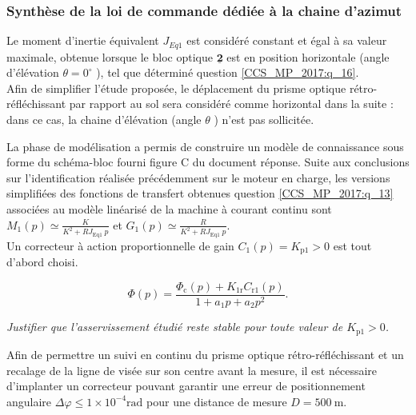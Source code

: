 %
\subsubsection{ Synthèse de la loi de commande dédiée à la chaine d'azimut}
Le moment d'inertie équivalent $J_{E q 1}$ est considéré constant et égal à sa valeur maximale, obtenue lorsque le bloc optique $\underline{\mathbf{2}}$ est en position horizontale (angle d'élévation $\theta=0^{\circ}$ ), tel que déterminé question \ref{CCS_MP_2017:q_16}.\\
Afin de simplifier l'étude proposée, le déplacement du prisme optique rétro-réfléchissant par rapport au sol sera considéré comme horizontal dans la suite : dans ce cas, la chaine d'élévation (angle $\theta$ ) n'est pas sollicitée.

La phase de modélisation a permis de construire un modèle de connaissance sous forme du schéma-bloc fourni figure C du document réponse. Suite aux conclusions sur l'identification réalisée précédemment sur le moteur en charge, les versions simplifiées des fonctions de transfert obtenues question \ref{CCS_MP_2017:q_13} associées au modèle linéarisé de la machine à courant continu sont $M_{1}(p) \simeq \frac{K}{K^{2}+R J_{\text {Eq1 }} p}$ et $G_{1}(p) \simeq \frac{R}{K^{2}+R J_{\text {Eq1 }} p}$.\\
Un correcteur à action proportionnelle de gain $C_{1}(p)=K_{\mathrm{p} 1}>0$ est tout d'abord choisi.\\

$$
\Phi(p)=\frac{\Phi_{\mathrm{c}}(p)+K_{1 \mathrm{r}} C_{\mathrm{r} 1}(p)}{1+a_{1} p+a_{2} p^{2}}.
$$

\textit{Justifier que l'asservissement étudié reste stable pour toute valeur de $K_{\mathrm{p} 1}>0$.}

\ifprof
\begin{corrige}
\end{corrige}
\else
\fi


Afin de permettre un suivi en continu du prisme optique rétro-réfléchissant et un recalage de la ligne de visée sur son centre avant la mesure, il est nécessaire d'implanter un correcteur pouvant garantir une erreur de positionnement angulaire $\Delta \varphi \leqslant 1 \times 10^{-4} \mathrm{rad}$ pour une distance de mesure $D=500 \mathrm{~m}$.\\


